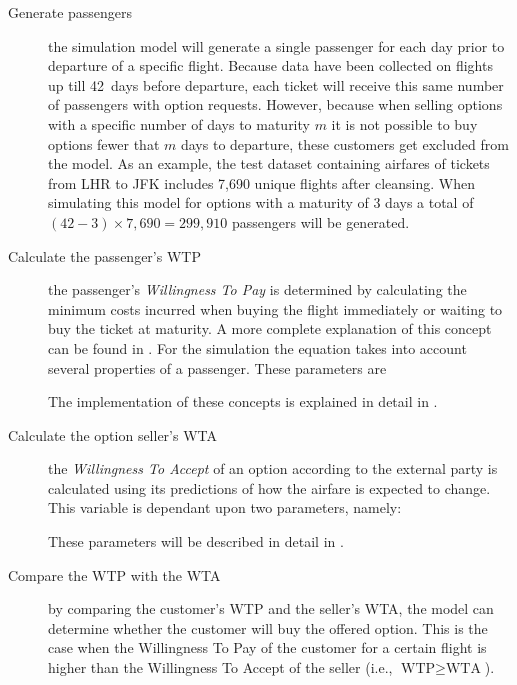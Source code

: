\begin{description}
\item[Generate passengers] the simulation model will generate a single passenger for each day prior to departure of a specific flight. Because data have been collected on flights up till 42~days before departure, each ticket will receive this same number of passengers with option requests. However, because when selling options with a specific number of days to maturity $m$ it is not possible to buy options fewer that $m$ days to departure, these customers get excluded from the model. As an example, the test dataset containing airfares of tickets from LHR to JFK includes 7,690 unique flights after cleansing. When simulating this model for options with a maturity of 3 days a total of $(42 - 3) \times 7,690 = 299,910$ passengers will be generated.
\item[Calculate the passenger's WTP] the passenger's \emph{Willingness To Pay} is determined by calculating the minimum costs incurred when buying the flight immediately or waiting to buy the ticket at maturity. A more complete explanation of this concept can be found in . For the simulation the equation takes into account several properties of a passenger. These parameters are  The implementation of these concepts is explained in detail in .
\item[Calculate the option seller's WTA] the \emph{Willingness To Accept} of an option according to the external party is calculated using its predictions of how the airfare is expected to change. This variable is dependant upon two parameters, namely:  These parameters will be described in detail in .
\item[Compare the WTP with the WTA] by comparing the customer's WTP and the seller's WTA, the model can determine whether the customer will buy the offered option. This is the case when the Willingness To Pay of the customer for a certain flight is higher than the Willingness To Accept of the seller (i.e., $\text{WTP} \ge \text{WTA}$).

\end{description}
